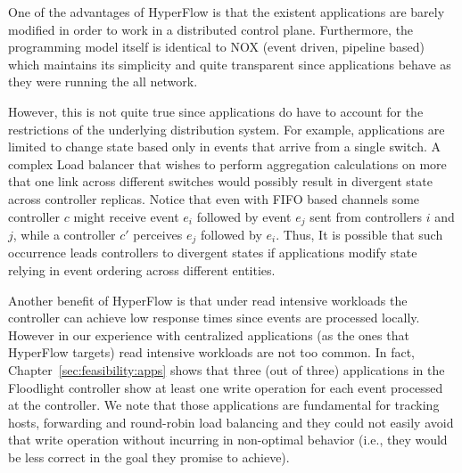 
One of the advantages of HyperFlow is that the existent applications are barely modified in order to work in a distributed control plane. 
Furthermore, the programming model itself is identical to NOX  (event driven, pipeline based) which maintains its simplicity and quite transparent since applications behave as they were running the all network. 

However, this is not quite true since applications do have to account for the restrictions of the underlying distribution system. 
For example, applications are limited to change state based only in events that arrive from a single switch. 
A complex Load balancer that wishes to perform aggregation calculations on more that one link across different switches would possibly result in divergent state across controller replicas. 
Notice that even with FIFO based channels some controller $c$ might receive event $e_i$ followed by event $e_j$ sent from controllers $i$ and $j$, while a controller $c'$ perceives $e_j$ followed by $e_i$. 
Thus, It is possible that such occurrence leads controllers to divergent states if applications modify state relying in event ordering across different entities. 

Another benefit of HyperFlow is that under read intensive workloads the controller can achieve low response times since  events are processed locally.
However in our experience with centralized applications (as the ones that HyperFlow targets) read intensive workloads are not too common.
In fact, Chapter~\ref{sec:feasibility:apps} shows that  three (out of three) applications in the Floodlight controller show at least one write operation for each event processed at the controller. 
We note that those applications are fundamental for tracking hosts, forwarding and round-robin load balancing and they could not easily  avoid that write operation without incurring in non-optimal behavior (i.e., they would be less correct in the goal they promise to achieve). 

